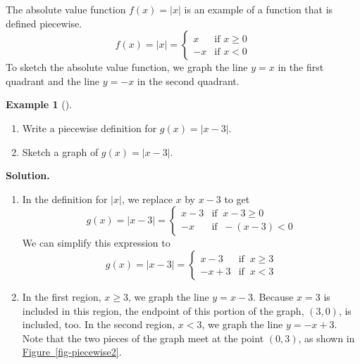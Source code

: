 \documentclass[10pt,]{book}
\theoremstyle{plain}
\theoremstyle{definition}
\theoremstyle{definition}
\theoremstyle{definition}
\newtheorem{example}[theorem]{Example}
\theoremstyle{definition}
\theoremstyle{definition}
\numberwithin{equation}{section}
\newcommand\abs[1]{\left|#1\right|}
\newcommand{\lt}{ < }
\newcommand{\amp}{ & }
\begin{document}
    The absolute value function \(f (x) = \abs{x}\) is an example of a function that is defined piecewise.
    \begin{equation*}
        f (x) =\abs{x} =
        \begin{cases}
        x \amp \text{if } x\ge 0\\
        -x  \amp \text{if } x\lt 0
        \end{cases}
    \end{equation*}
    To sketch the absolute value function, we graph the line \(y = x\) in the first quadrant and the line \(y = −x\) in the second quadrant.
%
\begin{example}[]\label{example-piecewise-def}
\leavevmode%
\begin{enumerate}[label=*\alph**]
\item\hypertarget{li-280}{}Write a piecewise definition for \(g(x) = \abs{x − 3}\).\item\hypertarget{li-281}{}Sketch a graph of \(g(x) = \abs{x − 3}\).\end{enumerate}
\par\medskip\noindent%
\textbf{Solution.}\quad \leavevmode%
\begin{enumerate}[label=*\alph**]
\item\hypertarget{li-282}{}In the definition for \(\abs{x}\), we replace \(x\) by \(x − 3\) to get
            \begin{equation*}
                g(x) =\abs{x-3} =
                \begin{cases}
                x-3 \amp \text{if }~ x-3\ge 0\\
                -x  \amp \text{if }~ -(x-3)\lt 0
                \end{cases}
            \end{equation*}
        We can simplify this expression to
            \begin{equation*}
                g(x) =\abs{x-3} =
                \begin{cases}
                x-3 \amp \text{if }~ x\ge 3\\
                -x+3  \amp \text{if }~ x\lt 3
                \end{cases}
            \end{equation*}\item\hypertarget{li-283}{}
            In the first region, \(x \ge 3\), we graph the line \(y = x − 3\). Because \(x = 3\) is included in this region, the endpoint of this portion of the graph, \((3, 0)\), is included, too. In the second region, \(x \lt 3\), we graph the line \(y = −x + 3\). Note that the two pieces of the graph meet at the point \((0, 3)\), as shown in \hyperref[fig-piecewise2]{Figure~\ref{fig-piecewise2}}.

\end{enumerate}
\end{example}
\end{document}
